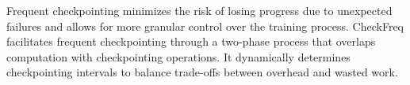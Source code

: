  Frequent checkpointing minimizes the risk of losing progress due to unexpected failures and allows for more granular control over the training process. CheckFreq \cite{checkfreq} facilitates frequent checkpointing through a two-phase process that overlaps computation with checkpointing operations. It dynamically determines checkpointing intervals to balance trade-offs between overhead and wasted work. %



